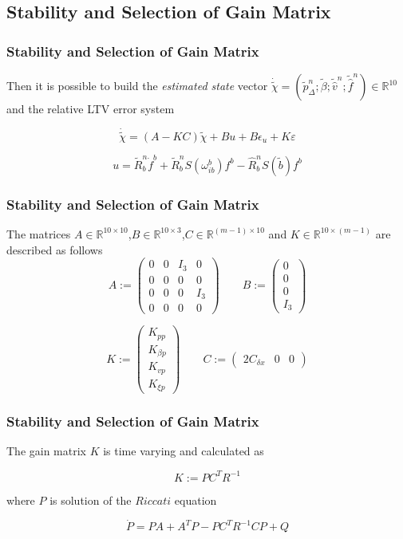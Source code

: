 \documentclass{beamer}
\begin{document}
    \subsection{Stability and Selection of Gain Matrix}
    \begin{frame}
		\frametitle{Stability and Selection of Gain Matrix}
		Then it is possible to build the \textit{estimated state} vector $\dot{\tilde{\chi}} = (\tilde{p}^n_\Delta;\tilde{\beta}; \tilde{\hat{v}}^n; \tilde{\hat{f}}^n) \in \mathds{R}^{10}$ and the relative LTV error system
		
		\[ \dot{\tilde{\chi}} = (A - KC)\tilde{\chi} + Bu + B\epsilon_u + K\varepsilon\]
		
		\[ u = \tilde{R}^n_b \dot{f}^b + \tilde{R}^n_b S(\omega^b_{ib})f^b - \hat{R}^n_b S(\tilde{b})f^b\]
	\end{frame}
	\begin{frame}
		\frametitle{Stability and Selection of Gain Matrix}
		The matrices $A \in \mathbb{R}^{10\times 10}$,$B \in \mathbb{R}^{10\times 3}$,$C \in \mathds{R}^{(m-1) \times 10} $ and $K \in \mathds{R}^{10 \times (m-1)}$ are described as follows
		$$
		A :=
		\begin{pmatrix}
		0 & 0 & I_3 & 0 \\ 
		0 & 0 & 0 & 0 \\
		0 & 0 & 0 & I_3 \\
		0 & 0 & 0 & 0
		\end{pmatrix}
		\qquad
		B := 
		\begin{pmatrix}
		0 \\ 0 \\ 0 \\ I_3
		\end{pmatrix}
		$$
		
		$$
		K := 
		\begin{pmatrix}
		K_{pp} \\ K_{\beta p} \\ K_{vp} \\ K_{\xi p}
		\end{pmatrix}
		\qquad
		C :=
		\begin{pmatrix}
		2C_{\delta x} & 0 & 0
		\end{pmatrix}
		$$
	\end{frame}
	\begin{frame}
		\frametitle{Stability and Selection of Gain Matrix}
		The gain matrix $K$ is time varying and calculated as
		
		\[ K := PC^TR^{-1} \]
		
		 where $P$ is solution of the $Riccati$ equation
		
		\[ \dot{P} = PA + A^TP - PC^TR^{-1}CP + Q\]
	\end{frame}
\end{document}
